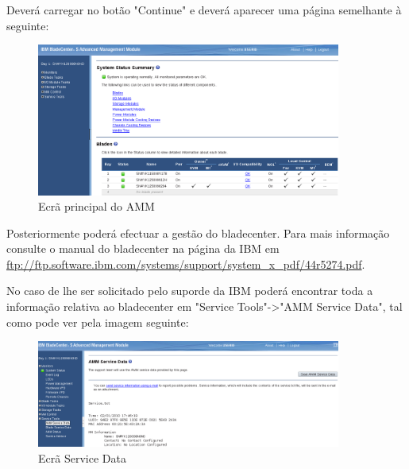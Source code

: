 Deverá carregar no botão "Continue" e deverá aparecer uma página semelhante à seguinte:

\begin{figure}[H]
    \begin{center}
        \includegraphics[width=10cm]{include/img/amm_bladecenterS_3}
    \end{center}
    \caption{Ecrã principal do AMM}
    \label{fig:amm-3}
\end{figure}


Posteriormente poderá efectuar a gestão do bladecenter. Para mais informação consulte o manual do bladecenter na página da IBM em \url{ftp://ftp.software.ibm.com/systems/support/system\_x\_pdf/44r5274.pdf}.

No caso de lhe ser solicitado pelo suporde da IBM poderá encontrar toda a informação relativa ao bladecenter em "Service Tools"->"AMM Service Data", tal como pode ver pela imagem seguinte:

\begin{figure}[H]
    \begin{center}
        \includegraphics[width=10cm]{include/img/amm_bladecenterS_4}
    \end{center}
    \caption{Ecrã Service Data}
    \label{fig:amm-4}
\end{figure}


